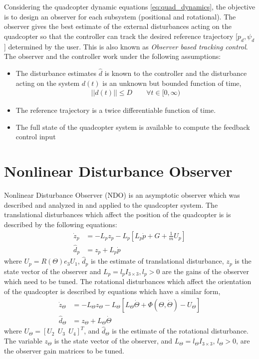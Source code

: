 \documentclass[letterpaper%
, twoside%
, 12pt%
,memoire%
, english%
,creativecommons,hyperref%
]{thETS}
\theoremstyle{newThmStyle}
\begin{document}
Considering the quadcopter dynamic equations \eqref{eq:quad_dynamics}, the objective is to design an observer for each subsystem (positional and rotational). The observer gives the best estimate of the external disturbances acting on the quadcopter so that the controller can track the desired reference trajectory [$p_d,\psi_d$] determined by the user. This is also known as \textit{Observer based tracking control}. The observer and the controller work under the following assumptions:
\begin{itemize}
\item The disturbance estimates $\hat{d}$ is known to the controller and the disturbance acting on the system $d(t)$ is an unknown but bounded function of time,
\begin{align}
||d(t)|| \leq D \quad \quad \forall t\in[0,\infty)
\end{align}
\item The reference trajectory is a twice differentiable function of time.
\item The full state of the quadcopter system is available to compute the feedback control input
\end{itemize}

\section{Nonlinear Disturbance Observer} \label{Sec:NDO}
Nonlinear Disturbance Observer (NDO) is an asymptotic observer which was described and analyzed in \citep{bash2019analysis} and applied to the quadcopter system. The translational disturbances which affect the position of the quadcopter is is described by the following equations: 
\begin{equation}
\begin{split}
\label{eqn:NDO1}
\dot{z}_p &= -L_pz_p - L_p[L_p\dot{p}+G+\frac{1}{m}U_p ]\\
\hat{d}_p&=z_p + L_p\dot{p}
\end{split}
\end{equation}
where $U_p=R(\Theta) e_3 U_1$, $\widehat{d}_p$ is the estimate of translational disturbance,  $z_p$ is the state vector of the observer and $L_p=l_p I_{3 \times 3}, l_p >0$ are the gains of the observer which need to be tuned. 
The rotational disturbances which affect the orientation of the quadcopter is described by equations which have a similar form, 
\begin{equation}
\begin{split}
\label{eqn:NDO2}
\dot{z}_\Theta &= -L_\Theta z_\Theta - L_\Theta[L_\Theta\dot{\Theta}+\Phi(\Theta,\dot{\Theta}) - U_\Theta] \\
\hat{d}_\Theta&=z_\Theta + L_\Theta\dot{\Theta}
\end{split}
\end{equation}
where $U_\Theta=[U_2\ \ U_3\ \ U_4]^T$, and $\widehat{d}_\Theta$ is the estimate of the rotational disturbance. The variable $z_\Theta$ is the state vector of the observer, and $L_\Theta=l_\Theta I_{3 \times 3}$,  $l_\Theta >0$, are the observer gain matrices to be tuned.
\end{document}
